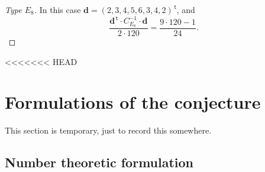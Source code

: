\documentclass{article}
\theoremstyle{definition}
\renewcommand{\top}{\,\mathsf{t}}
\begin{document}
\begin{proof}[Type $E_8$]
	In this case $\mathbf{d}=(	2,3,4,5,6,3,4,2)^{\top}$, and
	\[ \frac{\mathbf{d}^{\top}\cdot C_{E_8}^{-1}\cdot \mathbf{d}}{2\cdot 120}=\frac{9\cdot 120-1}{24}. \]
	\begin{comment}
	\[ 
	\frac{1}{2\cdot 120}
	\begin{pmatrix}
	2 \\ 3 \\ 4 \\5  \\ 6 \\ 3 \\ 4 \\ 2
	\end{pmatrix}^{\top}
	\cdot
	\begin{pmatrix}
	2 & -1 & 0 & 0 & 0 & 0 & 0 & 0\\
	-1 & 2 & -1 & 0 & 0 & 0 & 0 & 0\\
	0 & -1 & 2 & -1 & 0 & 0 & 0 & 0 \\
	0 & 0 & -1 & 2 & -1 & 0 & 0 & 0 \\
	0 & 0 & 0 & -1 & 2 & -1 & -1 & 0 \\
	0 & 0 & 0 & 0 & -1 & 2 & 0 & 0 \\
	0 & 0 & 0 & 0  & -1 & 0 & 2 & -1 \\
	0 & 0 & 0 & 0 & 0  & 0 & -1 & 2
	\end{pmatrix}^{-1} 
	\cdot
	\begin{pmatrix}
	2 \\ 3 \\ 4 \\5  \\ 6 \\ 3 \\ 4 \\ 2
	\end{pmatrix}
	=\frac{9\cdot 120-1}{24}.
	\]
	\end{comment}
\end{proof}

<<<<<<< HEAD
\section{Formulations of the conjecture}

This section is temporary, just to record this somewhere.
\smallskip

\subsection{Number theoretic formulation}
\end{document}
